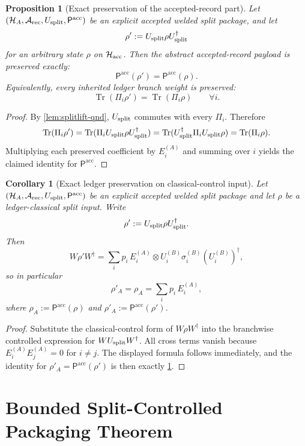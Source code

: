 \documentclass[11pt]{article}
\theoremstyle{definition}
\theoremstyle{plain}
\newtheorem{proposition}[definition]{Proposition}
\newtheorem{corollary}[definition]{Corollary}
\theoremstyle{remark}
\newcommand{\Arec}{\mathcal A_{\rm rec}}
\newcommand{\Hacc}{\mathcal H_{\rm acc}}
\newcommand{\HA}{\mathcal H_A}
\newcommand{\Pacc}{\mathsf P^{\mathrm{acc}}}
\newcommand{\Tr}{\operatorname{Tr}}
\newcommand{\1}{\mathbf 1}
\begin{document}
\begin{proposition}[Exact preservation of the accepted-record part]
\label{prop:splitlift-payload}
Let \((\HA,\Arec,U_{\rm split},\Pacc)\) be an explicit accepted welded split package, and let
\[
\rho':=U_{\rm split}\rho U_{\rm split}^\dagger
\]
for an arbitrary state \(\rho\) on \(\Hacc\).
Then the abstract accepted-record payload is preserved exactly:
\[
\Pacc(\rho')=\Pacc(\rho).
\]
Equivalently, every inherited ledger branch weight is preserved:
\[
\Tr(\Pi_i\rho')
=
\Tr(\Pi_i\rho)
\qquad
\forall i.
\]
\end{proposition}

\begin{proof}
By \cref{lem:splitlift-qnd}, \(U_{\rm split}\) commutes with every \(\Pi_i\). Therefore
\[
\Tr(\Pi_i\rho')
=
\Tr(\Pi_iU_{\rm split}\rho U_{\rm split}^\dagger)
=
\Tr(U_{\rm split}^\dagger \Pi_i U_{\rm split}\rho)
=
\Tr(\Pi_i\rho).
\]
Multiplying each preserved coefficient by \(E_i^{(A)}\) and summing over \(i\) yields the claimed
identity for \(\Pacc\).
\end{proof}

\begin{corollary}[Exact ledger preservation on classical-control input]
\label{cor:splitlift-classical}
Let \((\HA,\Arec,U_{\rm split},\Pacc)\) be an explicit accepted welded split package and let
\(\rho\) be a ledger-classical split input. Write
\[
\rho':=U_{\rm split}\rho U_{\rm split}^\dagger.
\]
Then
\[
W\rho'W^\dagger
=
\sum_i p_i\,E_i^{(A)}\otimes
U_i^{(B)}\sigma_i^{(B)}(U_i^{(B)})^\dagger,
\]
so in particular
\[
\rho'_A=\rho_A=\sum_i p_i\,E_i^{(A)},
\]
where \(\rho_A:=\Pacc(\rho)\) and \(\rho'_A:=\Pacc(\rho')\).
\end{corollary}

\begin{proof}
Substitute the classical-control form of \(W\rho W^\dagger\) into the branchwise controlled
expression for \(WU_{\rm split}W^\dagger\).
All cross terms vanish because \(E_i^{(A)}E_j^{(A)}=0\) for \(i\neq j\).
The displayed formula follows immediately, and the identity for \(\rho'_A=\Pacc(\rho')\) is then
exactly \cref{prop:splitlift-payload}.
\end{proof}

\section{Bounded Split-Controlled Packaging Theorem}
\label{sec:splitlift-theorem}
\end{document}

